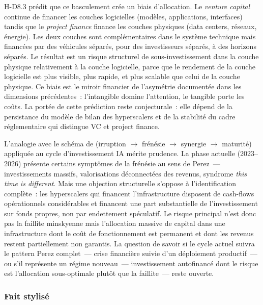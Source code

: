 H-D8.3 prédit que ce basculement crée un biais d'allocation. Le \emph{venture capital} continue de financer les couches logicielles (modèles, applications, interfaces) tandis que le \emph{project finance} finance les couches physiques (data centers, réseaux, énergie). Les deux couches sont complémentaires dans le système technique mais financées par des véhicules séparés, pour des investisseurs séparés, à des horizons séparés. Le résultat est un risque structurel de sous-investissement dans la couche physique relativement à la couche logicielle, parce que le rendement de la couche logicielle est plus visible, plus rapide, et plus scalable que celui de la couche physique. Ce biais est le miroir financier de l'asymétrie documentée dans les dimensions précédentes~: l'intangible domine l'attention, le tangible porte les coûts. La portée de cette prédiction reste conjecturale~: elle dépend de la persistance du modèle de bilan des hyperscalers et de la stabilité du cadre réglementaire qui distingue VC et project finance.

L'analogie avec le schéma de \textcite{perez_technological_2002} (irruption $\rightarrow$ frénésie $\rightarrow$ synergie $\rightarrow$ maturité) appliquée au cycle d'investissement IA mérite prudence. La phase actuelle (2023--2026) présente certains symptômes de la frénésie au sens de Perez~--- investissements massifs, valorisations déconnectées des revenus, syndrome \og \emph{this time is different}\fg{}. Mais une objection structurelle s'oppose à l'identification complète~: les hyperscalers qui financent l'infrastructure disposent de cash-flows opérationnels considérables et financent une part substantielle de l'investissement sur fonds propres, non par endettement spéculatif. Le risque principal n'est donc pas la faillite minskyenne mais l'allocation massive de capital dans une infrastructure dont le coût de fonctionnement est permanent et dont les revenus restent partiellement non garantis. La question de savoir si le cycle actuel suivra le pattern Perez complet~--- crise financière suivie d'un déploiement productif~--- ou s'il représente un régime nouveau~--- investissement autofinancé dont le risque est l'allocation sous-optimale plutôt que la faillite~--- reste ouverte.


\subsubsection{Fait stylisé}

